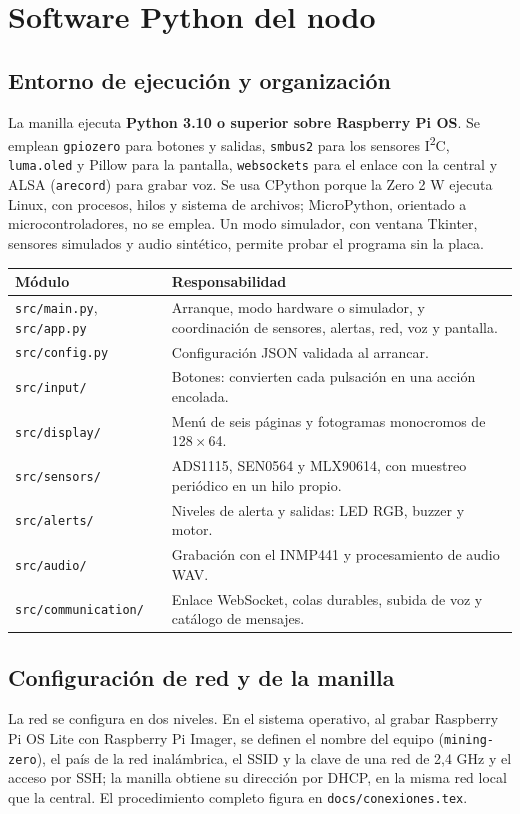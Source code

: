 \documentclass[10pt,a4paper]{article}
\newcommand{\code}[1]{{\small\urlstyle{tt}\nolinkurl{#1}}}
\newcommand{\newsection}[1]{\clearpage\section{#1}}
\begin{document}
\newsection{Software Python del nodo}
\label{sec:python}
\subsection{Entorno de ejecución y organización}
La manilla ejecuta \textbf{Python 3.10 o superior sobre Raspberry Pi OS}. Se emplean \code{gpiozero} para botones y salidas, \code{smbus2} para los sensores I\textsuperscript{2}C, \code{luma.oled} y Pillow para la pantalla, \code{websockets} para el enlace con la central y ALSA (\code{arecord}) para grabar voz. Se usa CPython porque la Zero 2 W ejecuta Linux, con procesos, hilos y sistema de archivos; MicroPython, orientado a microcontroladores, no se emplea. Un modo simulador, con ventana Tkinter, sensores simulados y audio sintético, permite probar el programa sin la placa.

\label{tab:archivos}
\begin{tabularx}{\linewidth}{@{}P{46mm}Y@{}}
\toprule\textbf{Módulo} & \textbf{Responsabilidad}\\\midrule
\code{src/main.py}, \code{src/app.py} & Arranque, modo hardware o simulador, y coordinación de sensores, alertas, red, voz y pantalla.\\
\code{src/config.py} & Configuración JSON validada al arrancar.\\
\code{src/input/} & Botones: convierten cada pulsación en una acción encolada.\\
\code{src/display/} & Menú de seis páginas y fotogramas monocromos de 128\,$\times$\,64.\\
\code{src/sensors/} & ADS1115, SEN0564 y MLX90614, con muestreo periódico en un hilo propio.\\
\code{src/alerts/} & Niveles de alerta y salidas: LED RGB, buzzer y motor.\\
\code{src/audio/} & Grabación con el INMP441 y procesamiento de audio WAV.\\
\code{src/communication/} & Enlace WebSocket, colas durables, subida de voz y catálogo de mensajes.\\\bottomrule
\end{tabularx}

\subsection{Configuración de red y de la manilla}
\label{sec:red-nodo}
La red se configura en dos niveles. En el sistema operativo, al grabar Raspberry Pi OS Lite con Raspberry Pi Imager, se definen el nombre del equipo (\code{mining-zero}), el país de la red inalámbrica, el SSID y la clave de una red de 2,4 GHz y el acceso por SSH; la manilla obtiene su dirección por DHCP, en la misma red local que la central. El procedimiento completo figura en \code{docs/conexiones.tex}.
\end{document}
